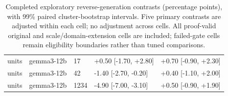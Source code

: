 \begin{table}[t]
\begin{tabular}{lllll}
units & gemma3-12b & 17 & +0.50 [-1.70, +2.80] & +0.70 [-0.90, +2.30] \\
units & gemma3-12b & 42 & -1.40 [-2.70, -0.20] & +0.40 [-1.10, +2.00] \\
units & gemma3-12b & 1234 & -4.90 [-7.00, -3.10] & +0.50 [-0.90, +1.90] \\
\bottomrule
\end{tabular}
\caption{Completed exploratory reverse-generation contrasts (percentage points), with 99\% paired cluster-bootstrap intervals. Five primary contrasts are adjusted within each cell; no adjustment across cells. All proof-valid original and scale/domain-extension cells are included; failed-gate cells remain eligibility boundaries rather than tuned comparisons.}
\label{tab:contrastive-snapshot}
\end{table}
